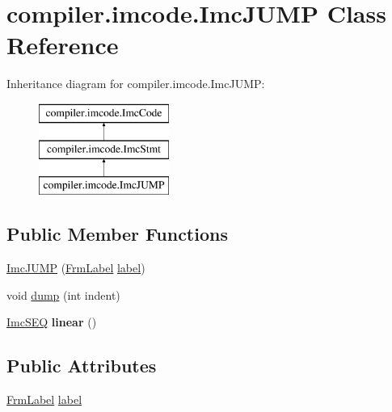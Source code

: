 \hypertarget{classcompiler_1_1imcode_1_1_imc_j_u_m_p}{}\section{compiler.\+imcode.\+Imc\+J\+U\+MP Class Reference}
\label{classcompiler_1_1imcode_1_1_imc_j_u_m_p}
Inheritance diagram for compiler.\+imcode.\+Imc\+J\+U\+MP\+:\begin{figure}[H]
\begin{center}
\leavevmode
\includegraphics[height=3.000000cm]{classcompiler_1_1imcode_1_1_imc_j_u_m_p}
\end{center}
\end{figure}
\subsection*{Public Member Functions}
\begin{DoxyCompactItemize}
\item 
\hyperlink{classcompiler_1_1imcode_1_1_imc_j_u_m_p_acae3a1008cc2a32818cfa7e7f08d3ce3}{Imc\+J\+U\+MP} (\hyperlink{classcompiler_1_1frames_1_1_frm_label}{Frm\+Label} \hyperlink{classcompiler_1_1imcode_1_1_imc_j_u_m_p_af2af1cea65af445c392fbac3ab4da490}{label})
\item 
void \hyperlink{classcompiler_1_1imcode_1_1_imc_j_u_m_p_ad53ded13619238b0fb2696a4aade579f}{dump} (int indent)
\item 
\mbox{\label{classcompiler_1_1imcode_1_1_imc_j_u_m_p_a399aaa62a1dc7a6e3809b26b79760aa2}} 
\hyperlink{classcompiler_1_1imcode_1_1_imc_s_e_q}{Imc\+S\+EQ} {\bfseries linear} ()
\end{DoxyCompactItemize}
\subsection*{Public Attributes}
\begin{DoxyCompactItemize}
\item 
\hyperlink{classcompiler_1_1frames_1_1_frm_label}{Frm\+Label} \hyperlink{classcompiler_1_1imcode_1_1_imc_j_u_m_p_af2af1cea65af445c392fbac3ab4da490}{label}
\end{DoxyCompactItemize}


